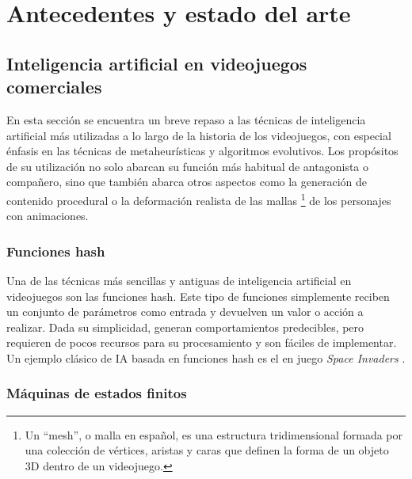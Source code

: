 \chapter{Antecedentes y estado del arte} \label{chap:antecedentes}

\section{Inteligencia artificial en videojuegos comerciales} \label{sec:ia_videojuegos}


En esta sección se encuentra un breve repaso a las técnicas de inteligencia artificial más utilizadas a lo largo de la historia de los videojuegos, con especial énfasis en las técnicas de metaheurísticas y algoritmos evolutivos. Los propósitos de su utilización no solo abarcan su función más habitual de antagonista o compañero, sino que también abarca otros aspectos como la generación de contenido procedural o la deformación realista de las mallas \footnote{Un ``mesh'', o malla en español, es una estructura tridimensional formada por una colección de vértices, aristas y caras que definen la forma de un objeto 3D dentro de un videojuego. } de los personajes con animaciones.

\subsection{Funciones hash}

Una de las técnicas más sencillas y antiguas de inteligencia artificial en videojuegos son las funciones hash. Este tipo de funciones simplemente reciben un conjunto de parámetros como entrada y devuelven un valor o acción a realizar. Dada su simplicidad, generan comportamientos predecibles, pero requieren de pocos recursos para su procesamiento y son fáciles de implementar. Un ejemplo clásico de IA basada en funciones hash es el en juego \textit{Space Invaders} . 

\subsection{Máquinas de estados finitos}

